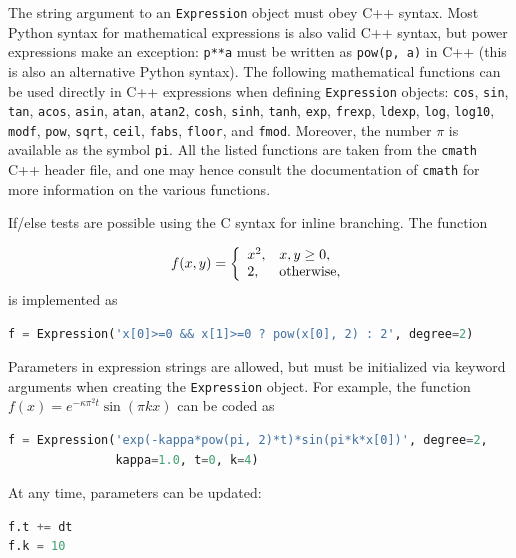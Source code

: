 \documentclass[graybox,envcountchap,sectrefs,final]{svmonodo}
\newenvironment{notice_mdfboxadmon}[1][]{
\begin{notice_mdfboxmdframed}[frametitle=#1]
}
{
\end{notice_mdfboxmdframed}
}
\begin{document}
\begin{notice_mdfboxadmon}
The string argument to an \texttt{Expression} object must obey C++ syntax.
Most Python syntax for mathematical expressions is also valid C++ syntax,
but power expressions make an exception: \texttt{p**a} must be written as
\texttt{pow(p, a)} in C++ (this is also an alternative Python syntax).
The following mathematical functions can be used directly
in C++
expressions when defining \texttt{Expression} objects:
\texttt{cos}, \texttt{sin}, \texttt{tan}, \texttt{acos}, \texttt{asin},
\texttt{atan}, \texttt{atan2}, \texttt{cosh}, \texttt{sinh}, \texttt{tanh}, \texttt{exp},
\texttt{frexp}, \texttt{ldexp}, \texttt{log}, \texttt{log10}, \texttt{modf},
\texttt{pow}, \texttt{sqrt}, \texttt{ceil}, \texttt{fabs}, \texttt{floor}, and \texttt{fmod}.
Moreover, the number $\pi$ is available as the symbol \texttt{pi}.
All the listed functions are taken from the \texttt{cmath} C++ header file, and
one may hence
consult the documentation of \texttt{cmath} for more information on the
various functions.

If/else tests are possible using the C syntax for inline branching. The
function

\[ f(x,y) = \left\lbrace\begin{array}{ll} x^2, & x, y\geq 0,\\
2, & \hbox{otherwise},\end{array}\right.\]
is implemented as

\begin{lstlisting}[language=Python,style=graycolor]
f = Expression('x[0]>=0 && x[1]>=0 ? pow(x[0], 2) : 2', degree=2)
\end{lstlisting}

Parameters in expression strings are allowed, but
must be initialized via keyword
arguments when creating the \texttt{Expression} object. For example, the
function $f(x)=e^{-\kappa\pi^2t}\sin(\pi k x)$ can be coded as

\begin{lstlisting}[language=Python,style=graycolor]
f = Expression('exp(-kappa*pow(pi, 2)*t)*sin(pi*k*x[0])', degree=2,
               kappa=1.0, t=0, k=4)
\end{lstlisting}
At any time, parameters can be updated:

\begin{lstlisting}[language=Python,style=graycolor]
f.t += dt
f.k = 10
\end{lstlisting}
\end{notice_mdfboxadmon} %
\end{document}
